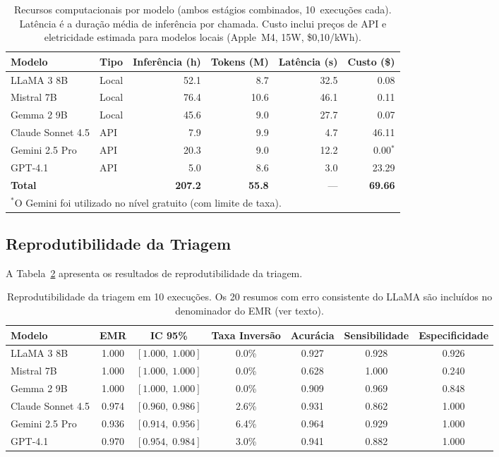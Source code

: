 \documentclass[12pt, a4paper]{article}
\newcommand{\ci}[2]{[#1,\;#2]}
\begin{document}
\begin{table}[H]
\centering
\caption{Recursos computacionais por modelo (ambos estágios combinados, 10~execuções cada). Latência é a duração média de inferência por chamada. Custo inclui preços de API e eletricidade estimada para modelos locais (Apple~M4, 15W, \$0,10/kWh).}
\label{tab:resources}
\small
\begin{tabular}{llrrrr}
\toprule
\textbf{Modelo} & \textbf{Tipo} & \textbf{Inferência (h)} & \textbf{Tokens (M)} & \textbf{Latência (s)} & \textbf{Custo (\$)} \\
\midrule
LLaMA 3 8B      & Local  & 52.1  & 8.7  & 32.5  & 0.08 \\
Mistral 7B       & Local  & 76.4  & 10.6 & 46.1  & 0.11 \\
Gemma 2 9B       & Local  & 45.6  & 9.0  & 27.7  & 0.07 \\
\midrule
Claude Sonnet 4.5 & API   & 7.9   & 9.9  & 4.7   & 46.11 \\
Gemini 2.5 Pro    & API   & 20.3  & 9.0  & 12.2  & 0.00$^{*}$ \\
GPT-4.1           & API   & 5.0   & 8.6  & 3.0   & 23.29 \\
\midrule
\textbf{Total}    &        & \textbf{207.2} & \textbf{55.8} & --- & \textbf{69.66} \\
\bottomrule
\multicolumn{6}{l}{\footnotesize $^{*}$O Gemini foi utilizado no nível gratuito (com limite de taxa).}
\end{tabular}
\end{table}

\subsection{Reprodutibilidade da Triagem}

A Tabela~\ref{tab:screening} apresenta os resultados de reprodutibilidade da triagem.

\begin{table}[H]
\centering
\caption{Reprodutibilidade da triagem em 10 execuções. Os 20 resumos com erro consistente do LLaMA são incluídos no denominador do EMR (ver texto).}
\label{tab:screening}
\begin{tabular}{lcccccc}
\toprule
\textbf{Modelo} & \textbf{EMR} & \textbf{IC 95\%} & \textbf{Taxa Inversão} & \textbf{Acurácia} & \textbf{Sensibilidade} & \textbf{Especificidade} \\
\midrule
LLaMA 3 8B       & 1.000 & $\ci{1.000}{1.000}$ & 0.0\% & 0.927 & 0.928 & 0.926 \\
Mistral 7B        & 1.000 & $\ci{1.000}{1.000}$ & 0.0\% & 0.628 & 1.000 & 0.240 \\
Gemma 2 9B        & 1.000 & $\ci{1.000}{1.000}$ & 0.0\% & 0.909 & 0.969 & 0.848 \\
\midrule
Claude Sonnet 4.5 & 0.974 & $\ci{0.960}{0.986}$ & 2.6\% & 0.931 & 0.862 & 1.000 \\
Gemini 2.5 Pro    & 0.936 & $\ci{0.914}{0.956}$ & 6.4\% & 0.964 & 0.929 & 1.000 \\
GPT-4.1           & 0.970 & $\ci{0.954}{0.984}$ & 3.0\% & 0.941 & 0.882 & 1.000 \\
\bottomrule
\end{tabular}
\end{table}
\end{document}
